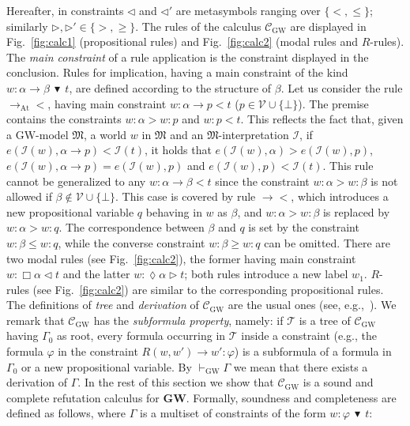 \documentclass[copyright,creativecommons]{eptcs}
\newcommand{\GWL}{\mathbf{GW}}
\newcommand{\GWM}{\mbox{$\mathrm{GW}$}}
\newcommand{\Calcw}{\Ccal_{\mathrm{GW}}}
\newcommand{\ruleToLTAt}{\to_{\mathrm{At}}<}
\newcommand{\ruleToLT}{\to<}
\newcommand{\Diam}{\lozenge}
\newcommand{\PV}{\Vcal}
\newcommand{\gt}{\rhd}
\newcommand{\lt}{\lhd}
\newcommand{\abstractorder}{\,\blacktriangledown\,}%
\newcommand{\provesw}[1]{\vdash_{\mathrm{GW}} #1}
\newcommand{\M}{\mathfrak{M}}
\newcommand{\ruleAxat}{\mathrm{Ax}\xspace}
\renewcommand{\a}{\alpha}
\renewcommand{\b}{\beta}
\newcommand{\G}{\Gamma}
\newcommand{\Ccal}{\mathcal{C}}
\newcommand{\Ical}{\mathcal{I}}
\newcommand{\Tcal}{\mathcal{T}}
\newcommand{\Vcal}{\mathcal{V}}
\begin{document}
Hereafter, in constraints $\lt$ and $\lt'$ are metasymbols ranging over
$\{<,\leq\}$; similarly $\gt,\gt' \in \{>,\geq\}$. The rules of the calculus
$\Calcw$ are displayed in Fig.~\ref{fig:calc1} (propositional rules)
and Fig.~\ref{fig:calc2} (modal rules and $R$-rules).
The \emph{main constraint} of a rule application is the constraint
displayed in the conclusion.  Rules for implication, having a main
constraint of the kind $w:\a\to \b\abstractorder t$, are defined
according to the structure of $\b$.  Let us consider the rule
$\ruleToLTAt$, having main constraint $w:\a\to p < t$
($p\in\PV\cup\{\bot\}$). The premise contains the constraints $w:\a >
w:p$ and $w:p < t$.  This reflects the fact that, given a $\GWM$-model
$\M$, a world $w$ in $\M$ and an $\M$-interpretation $\Ical$, if
$e(\Ical(w), \a\to p) < \Ical(t)$, it holds that $e(\Ical(w),\a) >
e(\Ical(w),p)$, $e(\Ical(w), \a\to p) = e(\Ical(w),p)$ and
$e(\Ical(w),p) < \Ical(t)$.  This rule cannot be generalized to any
$w:\a\to \b < t$ since the constraint $w:\a > w:\b$ is not allowed if
$\b\not\in\PV\cup\{\bot\}$.  This case is covered by rule $\ruleToLT$,
which introduces a new propositional variable $q$ behaving in $w$ as
$\b$, and $w:\a > w:\b$ is replaced by $w:\a > w: q$.  The
correspondence between $\b$ and $q$ is set by the constraint $w:\b\leq
w:q$, while the converse constraint $w:\b\geq w:q$ can be omitted.
There are two modal rules (see Fig.~\ref{fig:calc2}), the former
having main constraint $w:\Box\a \lt t$ and the latter $w:\Diam\a \gt
t$; both rules introduce a new label $w_1$.  $R$-rules (see
Fig.~\ref{fig:calc2}) are similar to the corresponding propositional
rules.  The definitions of \emph{tree} and \emph{derivation} of
$\Calcw$ are the usual ones (see, e.g.,~\cite{TroSch:00}).  We remark
that $\Calcw$ has the \emph{subformula property}, namely: if $\Tcal$
is a tree of $\Calcw$ having $\G_0$ as root, every formula occurring
in $\Tcal$ inside a constraint (e.g., the formula $\varphi$ in the
constraint $R(w,w')\to w':\varphi$) is a subformula of a formula in
$\G_0$ or a new propositional variable.  By $\provesw{\Gamma}$ we mean
that there exists a derivation of $\Gamma$.  In the rest of this
section we show that $\Calcw$ is a sound and complete refutation
calculus for $\GWL$. Formally, soundness and completeness are defined
as follows, where $\G$ is a multiset of constraints of the form
$w:\varphi\abstractorder t$:
\end{document}
